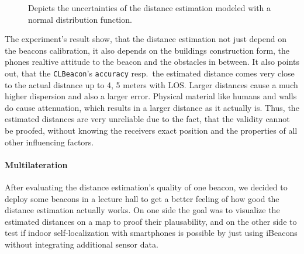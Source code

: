 \begin{figure}
\caption{Depicts the uncertainties of the distance estimation modeled with a normal distribution function.}
\label{fig:beacon_eval_ndf}
\end{figure}

The experiment's result show, that the distance estimation not just depend on the beacons calibration, it also depends on the buildings construction form, the phones realtive attitude to the beacon and the obstacles in between.
It also points out, that the \texttt{CLBeacon}'s \texttt{accuracy} resp.\ the estimated distance comes very close to the actual distance up to 4, 5 meters with \acs{LOS}.
Larger distances cause a much higher dispersion and also a larger error.
Physical material like humans and walls do cause attenuation, which results in a larger distance as it actually is.
Thus, the estimated distances are very unreliable due to the fact, that the validity cannot be proofed, without knowing the receivers exact position and the properties of all other influencing factors.

\paragraph{Multilateration}
After evaluating the distance estimation's quality of one beacon, we decided to deploy some beacons in a lecture hall to get a better feeling of how good the distance estimation actually works.
On one side the goal was to visualize the estimated distances on a map to proof their plausability, and on the other side to test if indoor self-localization with smartphones is possible by just using iBeacons without integrating additional sensor data.

